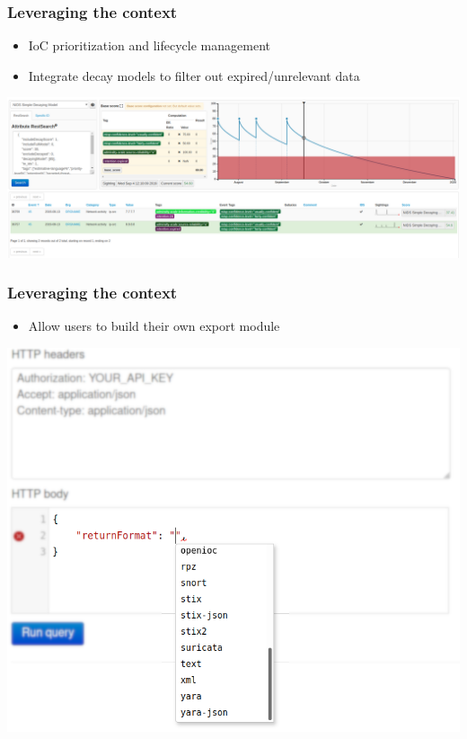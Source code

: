 \begin{frame}
    \frametitle{Leveraging the context}
    \begin{itemize}
        \item IoC prioritization and lifecycle management
        \item Integrate decay models to filter out expired/unrelevant data
    \end{itemize}
    \includegraphics[width=1.0\linewidth]{pictures/decaying-simulation.png}
\end{frame}

\begin{frame}
    \frametitle{Leveraging the context}
    \begin{itemize}
        \item Allow users to build their own export module
    \end{itemize}
    \includegraphics[width=0.9\linewidth]{pictures/return-formats.png}
\end{frame}

